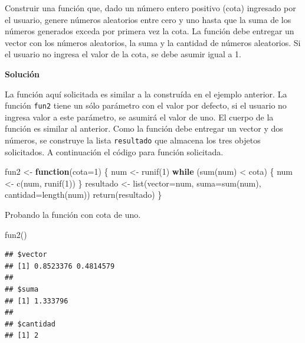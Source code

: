 \documentclass[
]{book}
\makeatletter
\newenvironment{Shaded}{\begin{snugshade}}{\end{snugshade}}
\newcommand{\AttributeTok}[1]{\textcolor[rgb]{0.77,0.63,0.00}{#1}}
\newcommand{\ControlFlowTok}[1]{\textcolor[rgb]{0.13,0.29,0.53}{\textbf{#1}}}
\newcommand{\DecValTok}[1]{\textcolor[rgb]{0.00,0.00,0.81}{#1}}
\newcommand{\FunctionTok}[1]{\textcolor[rgb]{0.00,0.00,0.00}{#1}}
\newcommand{\NormalTok}[1]{#1}
\newcommand{\OtherTok}[1]{\textcolor[rgb]{0.56,0.35,0.01}{#1}}
\newcommand{\SpecialCharTok}[1]{\textcolor[rgb]{0.00,0.00,0.00}{#1}}
\newenvironment{kframe}{%
\medskip{}
\setlength{\fboxsep}{.8em}
 \def\at@end@of@kframe{}%
 \ifinner\ifhmode%
  \def\at@end@of@kframe{\end{minipage}}%
  \begin{minipage}{\columnwidth}%
 \fi\fi%
 \def\FrameCommand##1{\hskip\@totalleftmargin \hskip-\fboxsep
 \colorbox{shadecolor}{##1}\hskip-\fboxsep
     \hskip-\linewidth \hskip-\@totalleftmargin \hskip\columnwidth}%
 \MakeFramed {\advance\hsize-\width
   \@totalleftmargin\z@ \linewidth\hsize
   \@setminipage}}%
 {\par\unskip\endMakeFramed%
 \at@end@of@kframe}
\renewenvironment{Shaded}{\begin{kframe}}{\end{kframe}}
\makeatother
\begin{document}
Construir una función que, dado un número entero positivo (cota) ingresado por el usuario, genere números aleatorios entre cero y uno hasta que la suma de los números generados exceda por primera vez la cota. La función debe entregar un vector con los números aleatorios, la suma y la cantidad de números aleatorios. Si el usuario no ingresa el valor de la cota, se debe asumir igual a 1.

\textbf{Solución}

La función aquí solicitada es similar a la construída en el ejemplo anterior. La función \texttt{fun2} tiene un sólo parámetro con el valor por defecto, si el usuario no ingresa valor a este parámetro, se asumirá el valor de uno. El cuerpo de la función es similar al anterior. Como la función debe entregar un vector y dos números, se construye la lista \texttt{resultado} que almacena los tres objetos solicitados. A continuación el código para función solicitada.

\begin{Shaded}
\begin{Highlighting}[]
\NormalTok{fun2 }\OtherTok{\textless{}{-}} \ControlFlowTok{function}\NormalTok{(}\AttributeTok{cota=}\DecValTok{1}\NormalTok{) \{}
\NormalTok{  num }\OtherTok{\textless{}{-}} \FunctionTok{runif}\NormalTok{(}\DecValTok{1}\NormalTok{)}
  \ControlFlowTok{while}\NormalTok{ (}\FunctionTok{sum}\NormalTok{(num) }\SpecialCharTok{\textless{}}\NormalTok{ cota) \{}
\NormalTok{    num }\OtherTok{\textless{}{-}} \FunctionTok{c}\NormalTok{(num, }\FunctionTok{runif}\NormalTok{(}\DecValTok{1}\NormalTok{))}
\NormalTok{  \}}
\NormalTok{  resultado }\OtherTok{\textless{}{-}} \FunctionTok{list}\NormalTok{(}\AttributeTok{vector=}\NormalTok{num,}
                    \AttributeTok{suma=}\FunctionTok{sum}\NormalTok{(num),}
                    \AttributeTok{cantidad=}\FunctionTok{length}\NormalTok{(num))}
  \FunctionTok{return}\NormalTok{(resultado)}
\NormalTok{\}}
\end{Highlighting}
\end{Shaded}

Probando la función con cota de uno.

\begin{Shaded}
\begin{Highlighting}[]
\FunctionTok{fun2}\NormalTok{()}
\end{Highlighting}
\end{Shaded}

\begin{verbatim}
## $vector
## [1] 0.8523376 0.4814579
## 
## $suma
## [1] 1.333796
## 
## $cantidad
## [1] 2
\end{verbatim}
\end{document}
